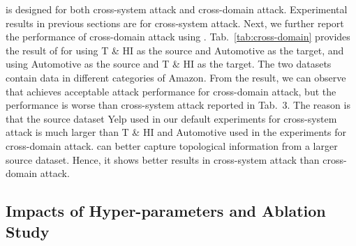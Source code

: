 \begin{table}[!t]
	\centering
	\caption{Results using different hyper-parameters.}
	\label{tab:exp_para}
\end{table}

\ours is designed for both cross-system attack and cross-domain attack. 
Experimental results in previous sections are for cross-system attack.
Next, we further report the performance of cross-domain attack using \ours.
Tab.~\ref{tab:cross-domain} provides the result of \ours for using T \& HI as the source and Automotive as the target, and using Automotive as the source and T \& HI as the target.
The two datasets contain data in different categories of Amazon.
From the result, we can observe that \ours achieves acceptable attack performance for cross-domain attack, but the performance is worse than cross-system attack reported in Tab.~3.
The reason is that the source dataset Yelp used in our default experiments for cross-system attack is much larger than T \& HI and Automotive used in the experiments for cross-domain attack.
\ours can better capture topological information from a larger source dataset.
Hence, it shows better results in cross-system attack than cross-domain attack.



\subsection{Impacts of Hyper-parameters and Ablation Study}




